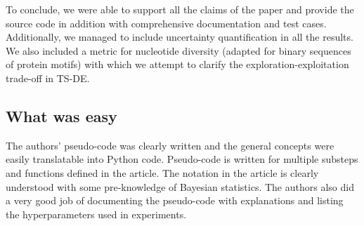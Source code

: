 To conclude, we were able to support all the claims of the paper and provide the source code in addition with comprehensive documentation and test cases. Additionally, we managed to include uncertainty quantification in all the results. We also included a metric for nucleotide diversity (adapted for binary sequences of protein motifs) with which we attempt to clarify the exploration-exploitation trade-off in TS-DE. 

\subsection{What was easy}
The authors' pseudo-code was clearly written and the general concepts were easily translatable into Python code. Pseudo-code is written for multiple substeps and functions defined in the article. The notation in the article is clearly understood with some pre-knowledge of Bayesian statistics. The authors also did a very good job of documenting the pseudo-code with explanations and listing the hyperparameters used in experiments.

